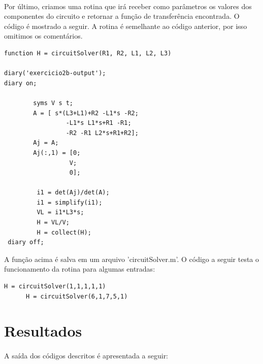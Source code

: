 \documentclass[a4paper,11pt]{article}
\begin{document}
\paragraph{}Por último, criamos uma rotina que irá receber
como parâmetros os valores dos componentes do circuito 
e retornar a função de transferência encontrada. O código
é mostrado a seguir. A rotina é semelhante ao código anterior,
por isso omitimos os comentários.
\newpage
\begin{lstlisting}[frame=single]
  function H = circuitSolver(R1, R2, L1, L2, L3)

diary('exercicio2b-output');
diary on;

		syms V s t;
		A = [ s*(L3+L1)+R2 -L1*s -R2; 
		         -L1*s L1*s+R1 -R1;
		         -R2 -R1 L2*s+R1+R2];
		Aj = A;
		Aj(:,1) = [0;
		          V;
		          0];

		 i1 = det(Aj)/det(A);
		 i1 = simplify(i1);
		 VL = i1*L3*s;
		 H = VL/V;
		 H = collect(H);
 diary off;
\end{lstlisting}

A função acima é salva em um arquivo 'circuitSolver.m'. O código 
a seguir testa o funcionamento da rotina para algumas entradas:

\begin{lstlisting}[frame=single]
      H = circuitSolver(1,1,1,1,1)
      H = circuitSolver(6,1,7,5,1)
\end{lstlisting}
 \newpage
\section{Resultados}

\paragraph{}A saída dos códigos descritos é apresentada a seguir:
\end{document}
